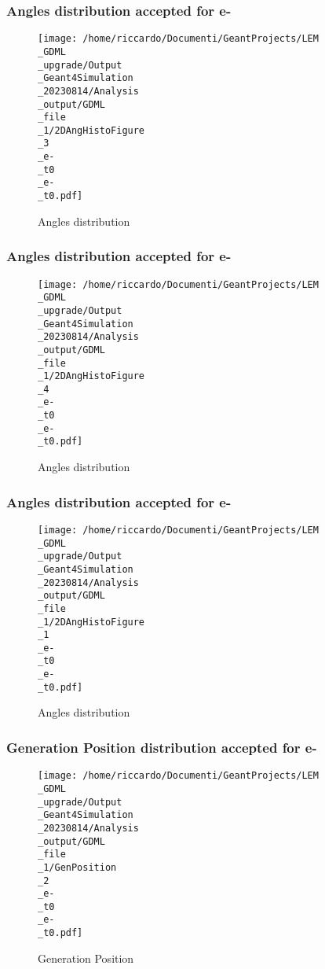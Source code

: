 \documentclass[8pt]{beamer}
\begin{document}
            \begin{frame}
                \frametitle{Angles distribution accepted for e-}
            
        \begin{figure}[h]
            \centering
            \texttt{[image: /home/riccardo/Documenti/GeantProjects/LEM\\\_GDML\\\_upgrade/Output\\\_Geant4Simulation\\\_20230814/Analysis\\\_output/GDML\\\_file\\\_1/2DAngHistoFigure\\\_3\\\_e-\\\_t0\\\_e-\\\_t0.pdf]}
            \caption{Angles distribution}
        \end{figure}
        
            \end{frame}
            
            \begin{frame}
                \frametitle{Angles distribution accepted for e-}
            
        \begin{figure}[h]
            \centering
            \texttt{[image: /home/riccardo/Documenti/GeantProjects/LEM\\\_GDML\\\_upgrade/Output\\\_Geant4Simulation\\\_20230814/Analysis\\\_output/GDML\\\_file\\\_1/2DAngHistoFigure\\\_4\\\_e-\\\_t0\\\_e-\\\_t0.pdf]}
            \caption{Angles distribution}
        \end{figure}
        
            \end{frame}
            
            \begin{frame}
                \frametitle{Angles distribution accepted for e-}
            
        \begin{figure}[h]
            \centering
            \texttt{[image: /home/riccardo/Documenti/GeantProjects/LEM\\\_GDML\\\_upgrade/Output\\\_Geant4Simulation\\\_20230814/Analysis\\\_output/GDML\\\_file\\\_1/2DAngHistoFigure\\\_1\\\_e-\\\_t0\\\_e-\\\_t0.pdf]}
            \caption{Angles distribution}
        \end{figure}
        
            \end{frame}
            
            \begin{frame}
                \frametitle{Generation Position distribution accepted for e-}
            
        \begin{figure}[h]
            \centering
            \texttt{[image: /home/riccardo/Documenti/GeantProjects/LEM\\\_GDML\\\_upgrade/Output\\\_Geant4Simulation\\\_20230814/Analysis\\\_output/GDML\\\_file\\\_1/GenPosition\\\_2\\\_e-\\\_t0\\\_e-\\\_t0.pdf]}
            \caption{Generation Position}
        \end{figure}
        
            \end{frame}
            
\end{document}
